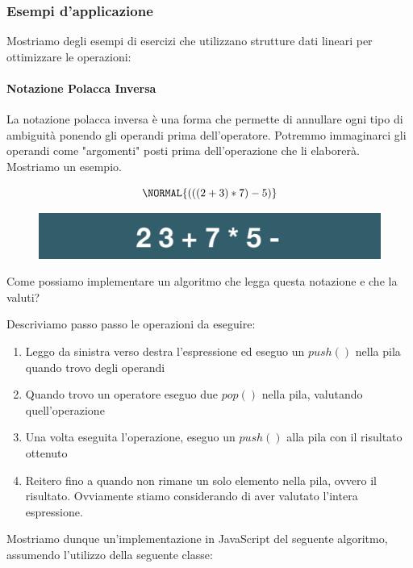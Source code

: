 \documentclass{article}
\begin{document}
\newpage

\subsubsection{Esempi d'applicazione} Mostriamo degli esempi di esercizi che utilizzano strutture dati lineari per ottimizzare le operazioni:

\paragraph{Notazione Polacca Inversa} La notazione polacca inversa è una forma che permette di annullare ogni tipo di ambiguità ponendo gli operandi prima dell'operatore. Potremmo immaginarci gli operandi come "argomenti" posti prima dell'operazione che li elaborerà. Mostriamo un esempio.

\begin{equation}
\NORMAL{(((2+3)*7)-5)}
\end{equation}

\begin{figure}[htbp]
    \center
    \includegraphics[scale=0.5]{img/NPI.png}
\end{figure}

Come possiamo implementare un algoritmo che legga questa notazione e che la valuti?

Descriviamo passo passo le operazioni da eseguire:

\begin{enumerate}
    \item Leggo da sinistra verso destra l'espressione ed eseguo un $push()$ nella pila quando trovo degli operandi
    \item Quando trovo un operatore eseguo due $pop()$ nella pila, valutando quell'operazione
    \item Una volta eseguita l'operazione, eseguo un $push()$ alla pila con il risultato ottenuto
    \item Reitero fino a quando non rimane un solo elemento nella pila, ovvero il risultato. Ovviamente stiamo considerando di aver valutato l'intera espressione.
\end{enumerate}

Mostriamo dunque un'implementazione in JavaScript del seguente algoritmo, assumendo l'utilizzo della seguente classe:
\end{document}
